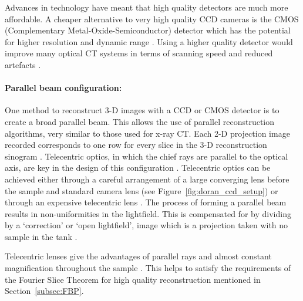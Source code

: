 	
	Advances in technology have meant that  high quality detectors are much more affordable. A cheaper alternative to very high quality CCD cameras is the CMOS (Complementary Metal-Oxide-Semiconductor) detector which has the potential for higher resolution and dynamic range \cite{Doran:2008kh}. Using a higher quality detector would improve many optical CT systems  in terms of scanning speed and reduced artefacts \cite{Tarte:2007, Doran:2001ee}.
	
	
	\paragraph{Parallel beam configuration:} One method to reconstruct 3-D images with a CCD or CMOS detector is to create a broad parallel beam. This allows the use of parallel reconstruction algorithms, very similar to those used for x-ray CT. Each 2-D projection image recorded corresponds to one row for every slice in the 3-D reconstruction sinogram \cite{Doran:2008kh}.
	Telecentric optics, in which the chief rays are parallel to the optical axis, are key in the design of this configuration \cite{Walls:2005ja}. Telecentric optics can be achieved either through a careful arrangement  of  a large converging lens before the sample and standard camera lens  \cite{Doran:2001ee} (see Figure~\ref{fig:doran_ccd_setup}) or through an expensive telecentric lens \cite{Sakhalkar:2008exa}. The process of forming a parallel beam results in non-uniformities in the lightfield. This is compensated for by dividing by a `correction' or `open lightfield', image which is a projection taken with no sample in the tank \cite{Doran:2001ee}.
	
	Telecentric lenses give the advantages of parallel rays and almost constant magnification throughout the sample \cite{Oldham:2007ku}. This helps to satisfy the requirements of the Fourier Slice Theorem for high quality reconstruction mentioned in Section~\ref{subsec:FBP}.
	
